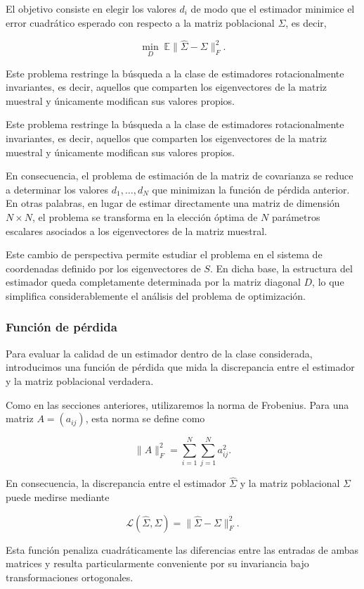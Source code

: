 \documentclass[letterpaper,12pt,oneside]{book}
\begin{document}
El objetivo consiste en elegir los valores $d_i$ de modo que el estimador minimice el error cuadrático esperado con respecto a la matriz poblacional $\Sigma$, es decir,

\[
\min_{D} \;
\mathbb{E}\|\hat{\Sigma}-\Sigma\|_F^2.
\]

Este problema restringe la búsqueda a la clase de estimadores rotacionalmente invariantes, es decir, aquellos que comparten los eigenvectores de la matriz muestral y únicamente modifican sus valores propios.

Este problema restringe la búsqueda a la clase de estimadores rotacionalmente invariantes, es decir, aquellos que comparten los eigenvectores de la matriz muestral y únicamente modifican sus valores propios.

En consecuencia, el problema de estimación de la matriz de covarianza se reduce a determinar los valores $d_1,\dots,d_N$ que minimizan la función de pérdida anterior. En otras palabras, en lugar de estimar directamente una matriz de dimensión $N\times N$, el problema se transforma en la elección óptima de $N$ parámetros escalares asociados a los eigenvectores de la matriz muestral.

Este cambio de perspectiva permite estudiar el problema en el sistema de coordenadas definido por los eigenvectores de $S$. En dicha base, la estructura del estimador queda completamente determinada por la matriz diagonal $D$, lo que simplifica considerablemente el análisis del problema de optimización.

\subsubsection*{Función de pérdida}

Para evaluar la calidad de un estimador dentro de la clase considerada, introducimos una función de pérdida que mida la discrepancia entre el estimador y la matriz poblacional verdadera.

Como en las secciones anteriores, utilizaremos la norma de Frobenius. Para una matriz $A=(a_{ij})$, esta norma se define como

\[
\|A\|_F^2
=
\sum_{i=1}^{N}\sum_{j=1}^{N} a_{ij}^2.
\]

En consecuencia, la discrepancia entre el estimador $\hat{\Sigma}$ y la matriz poblacional $\Sigma$ puede medirse mediante

\[
\mathcal{L}(\hat{\Sigma},\Sigma)
=
\|\hat{\Sigma}-\Sigma\|_F^2.
\]

Esta función penaliza cuadráticamente las diferencias entre las entradas de ambas matrices y resulta particularmente conveniente por su invariancia bajo transformaciones ortogonales.
\end{document}

